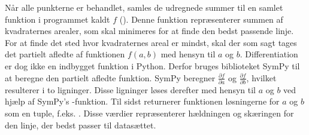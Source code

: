 Når alle punkterne er behandlet, samles de udregnede summer til en samlet funktion i programmet kaldt $f$ (). Denne funktion repræsenterer summen af kvadraternes arealer, som skal minimeres for at finde den bedst passende linje. For at finde det sted hvor kvadraternes areal er mindst, skal der som sagt tages det partielt afledte af funktionen $f(a,b)$ med hensyn til $a$ og $b$. Differentiation er dog ikke en indbygget funktion i Python. Derfor bruges biblioteket SymPy til at beregne den partielt afledte funktion. SymPy beregner $\frac{\partial f}{\partial a}$ og $\frac{\partial f}{\partial b}$, hvilket resulterer i to ligninger. Disse ligninger løses derefter med hensyn til $a$ og $b$ ved hjælp af SymPy's -funktion. Til sidst returnerer funktionen løsningerne for $a$ og $b$ som en tuple, f.eks. \pythoninline{[a, b]}. Disse værdier repræsenterer hældningen og skæringen for den linje, der bedst passer til datasættet.

